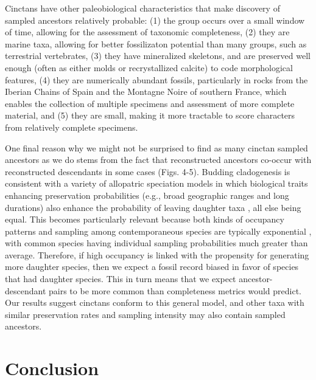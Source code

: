 \documentclass{article}
\begin{document}
Cinctans have other paleobiological characteristics that make discovery of sampled ancestors relatively probable: (1) the group occurs over a small window of time, allowing for the assessment of taxonomic completeness, (2) they are marine taxa, allowing for better fossilizaton potential than many groups, such as terrestrial vertebrates, (3) they have mineralized skeletons, and are preserved well enough (often as either molds or recrystallized calcite) to code morphological features, (4) they are numerically abundant fossils, particularly in rocks from the Iberian Chains of Spain and the Montagne Noire of southern France, which enables the collection of multiple specimens and assessment of more complete material, and (5) they are small, making it more tractable to score characters from relatively complete specimens.

One final reason why we might not be surprised to find as many cinctan sampled ancestors as we do stems from the fact that reconstructed ancestors co-occur with reconstructed descendants in some cases (Figs. 4-5).  Budding cladogenesis is consistent with a variety of allopatric speciation models in which biological traits enhancing preservation probabilities (e.g., broad geographic ranges and long durations) also enhance the probability of leaving daughter taxa \citep{WagnerErwin1995}, all else being equal. This becomes particularly relevant because both kinds of occupancy patterns and sampling among contemporaneous species are typically exponential \citep{Liow2013,WagnerMarcot2013,Foote2016}, with common species having individual sampling probabilities much greater than average. Therefore, if high occupancy is linked with the propensity for generating more daughter species, then we expect a fossil record biased in favor of species that had daughter species.  This in turn means that we expect ancestor-descendant pairs to be more common than completeness metrics would predict.  Our results suggest cinctans conform to this general model, and other taxa with similar preservation rates and sampling intensity may also contain sampled ancestors. 







\section{Conclusion}
\end{document}
